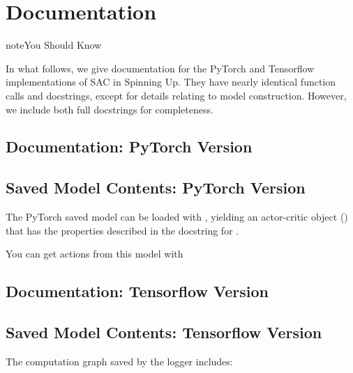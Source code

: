 \documentclass[letterpaper,10pt,english]{sphinxmanual}
\begin{document}
\section{Documentation}
\label{\detokenize{algorithms/sac:documentation}}
\begin{sphinxadmonition}{note}{You Should Know}

In what follows, we give documentation for the PyTorch and Tensorflow implementations of SAC in Spinning Up. They have nearly identical function calls and docstrings, except for details relating to model construction. However, we include both full docstrings for completeness.
\end{sphinxadmonition}


\subsection{Documentation: PyTorch Version}
\label{\detokenize{algorithms/sac:documentation-pytorch-version}}

\subsection{Saved Model Contents: PyTorch Version}
\label{\detokenize{algorithms/sac:saved-model-contents-pytorch-version}}
The PyTorch saved model can be loaded with , yielding an actor-critic object () that has the properties described in the docstring for .

You can get actions from this model with

\begin{sphinxVerbatim}[commandchars=\\\{\}]
   
\end{sphinxVerbatim}


\subsection{Documentation: Tensorflow Version}
\label{\detokenize{algorithms/sac:documentation-tensorflow-version}}

\subsection{Saved Model Contents: Tensorflow Version}
\label{\detokenize{algorithms/sac:saved-model-contents-tensorflow-version}}
The computation graph saved by the logger includes:
\end{document}
